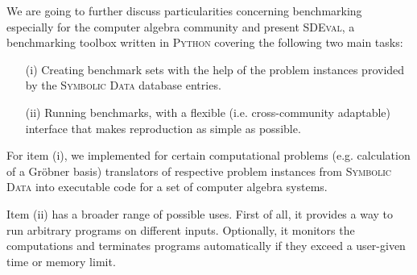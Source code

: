 \documentclass[12pt]{article}
\begin{document}
We are going to further discuss particularities concerning benchmarking
especially for the computer algebra community and present \textsc{SDEval}, a
benchmarking toolbox written in \textsc{Python} covering the following two main
tasks:
\begin{itemize}
\item[(i)] Creating benchmark sets with the help of the problem instances
  provided by the \textsc{Symbolic Data} database entries.
\item[(ii)] Running benchmarks, with a flexible (i.e. cross-community
  adaptable) interface that makes reproduction as simple as possible.
\end{itemize}

For item (i), we implemented for certain computational problems
(e.g. calculation of a Gr\"obner basis) translators of respective problem
instances from \textsc{Symbolic Data} into executable code for a set of
computer algebra systems.


Item (ii) has a broader range of possible uses. First of all, it provides a way
to run arbitrary programs on different inputs. Optionally, it monitors the
computations and terminates programs automatically if they exceed a user-given
time or memory limit.

\end{document}
